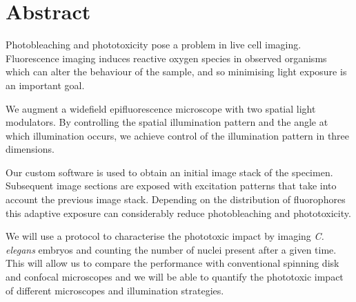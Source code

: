 \section*{Abstract}
\begin{summary}
Photobleaching and phototoxicity pose a problem in live cell
imaging. Fluorescence imaging induces reactive oxygen species in
observed organisms which can alter the behaviour of the sample, and so
minimising light exposure is an important goal.

We augment a widefield epifluorescence microscope with two spatial
light modulators. By controlling the spatial illumination pattern and
the angle at which illumination occurs, we achieve control of the
illumination pattern in three dimensions.

Our custom software is used to obtain an initial image stack of the
specimen. Subsequent image sections are exposed with excitation
patterns that take into account the previous image stack. Depending on
the distribution of fluorophores this adaptive exposure can
considerably reduce photobleaching and phototoxicity.

We will use a protocol to characterise the phototoxic impact by
 imaging \emph{C. elegans} embryos and
counting the number of nuclei present after a given time.  This will
allow us to compare the performance with conventional spinning disk
and confocal microscopes and we will be able to quantify the
phototoxic impact of different microscopes and illumination
strategies.
\end{summary}
